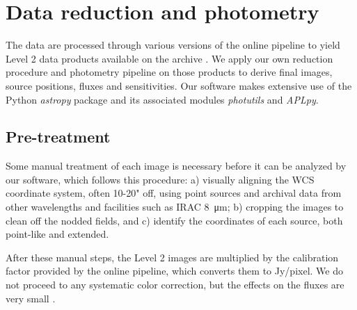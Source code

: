 \section{Data reduction and photometry}

The data are processed through various versions of the online pipeline to yield Level 2 data products available on the archive \citep{Herter:2013by}. We apply our own reduction procedure and photometry pipeline on those products to derive final images, source positions, fluxes and sensitivities. Our software makes extensive use of the Python \textit{astropy} package \citep{2013A&A...558A..33A} and its associated modules \textit{photutils} and \textit{APLpy}. 

\subsection{Pre-treatment}
Some manual treatment of each image is necessary before it can be analyzed by our software, which follows this procedure: a) visually aligning the WCS coordinate system, often 10-20" off, using point sources and archival data from other wavelengths and facilities such as IRAC \SI{8}{\micro\meter}; b) cropping the images to clean off the nodded fields, and c) identify the coordinates of each source, both point-like and extended.

After these manual steps, the Level 2 images are multiplied by the calibration factor provided by the online pipeline, which converts them to Jy/pixel. We do not proceed to any systematic color correction, but the effects on the fluxes are very small \citep{Herter:2013by}.

